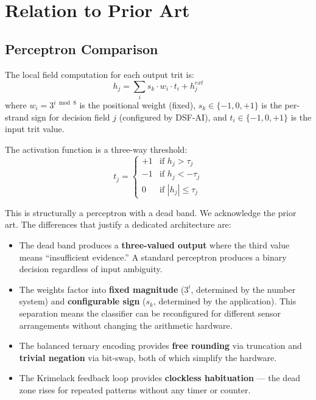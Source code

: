 \documentclass[11pt, a4paper]{article}
\begin{document}
\section{Relation to Prior Art}

\subsection{Perceptron Comparison}

The local field computation for each output trit is:
\begin{equation}
  h_j = \sum_{i} s_k \cdot w_i \cdot t_i + h_j^{ext}
\end{equation}
where $w_i = 3^{i \bmod 8}$ is the positional weight (fixed),
$s_k \in \{-1, 0, +1\}$ is the per-strand sign for decision
field $j$ (configured by DSF-AI), and $t_i \in \{-1, 0, +1\}$
is the input trit value.

The activation function is a three-way threshold:
\begin{equation}
  t_j = \begin{cases}
    +1 & \text{if } h_j > \tau_j \\
    -1 & \text{if } h_j < -\tau_j \\
    0  & \text{if } |h_j| \leq \tau_j
  \end{cases}
\end{equation}

This is structurally a perceptron with a dead band. We acknowledge
the prior art. The differences that justify a dedicated architecture
are:

\begin{itemize}[nosep]
  \item The dead band produces a \textbf{three-valued output}
        where the third value means ``insufficient evidence.''
        A standard perceptron produces a binary decision regardless
        of input ambiguity.
  \item The weights factor into \textbf{fixed magnitude} ($3^i$,
        determined by the number system) and \textbf{configurable
        sign} ($s_k$, determined by the application). This
        separation means the classifier can be reconfigured for
        different sensor arrangements without changing the
        arithmetic hardware.
  \item The balanced ternary encoding provides \textbf{free rounding}
        via truncation and \textbf{trivial negation} via bit-swap,
        both of which simplify the hardware.
  \item The Krimelack feedback loop provides \textbf{clockless
        habituation} --- the dead zone rises for repeated patterns
        without any timer or counter.
\end{itemize}
\end{document}
